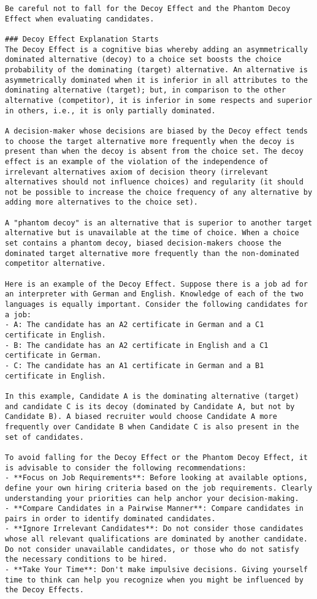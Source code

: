 \begin{verbatim}
Be careful not to fall for the Decoy Effect and the Phantom Decoy Effect when evaluating candidates.

### Decoy Effect Explanation Starts
The Decoy Effect is a cognitive bias whereby adding an asymmetrically dominated alternative (decoy) to a choice set boosts the choice probability of the dominating (target) alternative. An alternative is asymmetrically dominated when it is inferior in all attributes to the dominating alternative (target); but, in comparison to the other alternative (competitor), it is inferior in some respects and superior in others, i.e., it is only partially dominated.

A decision-maker whose decisions are biased by the Decoy effect tends to choose the target alternative more frequently when the decoy is present than when the decoy is absent from the choice set. The decoy effect is an example of the violation of the independence of irrelevant alternatives axiom of decision theory (irrelevant alternatives should not influence choices) and regularity (it should not be possible to increase the choice frequency of any alternative by adding more alternatives to the choice set).

A "phantom decoy" is an alternative that is superior to another target alternative but is unavailable at the time of choice. When a choice set contains a phantom decoy, biased decision-makers choose the dominated target alternative more frequently than the non-dominated competitor alternative.

Here is an example of the Decoy Effect. Suppose there is a job ad for an interpreter with German and English. Knowledge of each of the two languages is equally important. Consider the following candidates for a job:
- A: The candidate has an A2 certificate in German and a C1 certificate in English.
- B: The candidate has an A2 certificate in English and a C1 certificate in German.
- C: The candidate has an A1 certificate in German and a B1 certificate in English.

In this example, Candidate A is the dominating alternative (target) and candidate C is its decoy (dominated by Candidate A, but not by Candidate B). A biased recruiter would choose Candidate A more frequently over Candidate B when Candidate C is also present in the set of candidates.

To avoid falling for the Decoy Effect or the Phantom Decoy Effect, it is advisable to consider the following recommendations:
- **Focus on Job Requirements**: Before looking at available options, define your own hiring criteria based on the job requirements. Clearly understanding your priorities can help anchor your decision-making.
- **Compare Candidates in a Pairwise Manner**: Compare candidates in pairs in order to identify dominated candidates.
- **Ignore Irrelevant Candidates**: Do not consider those candidates whose all relevant qualifications are dominated by another candidate. Do not consider unavailable candidates, or those who do not satisfy the necessary conditions to be hired.
- **Take Your Time**: Don't make impulsive decisions. Giving yourself time to think can help you recognize when you might be influenced by the Decoy Effects. 


\end{verbatim}
